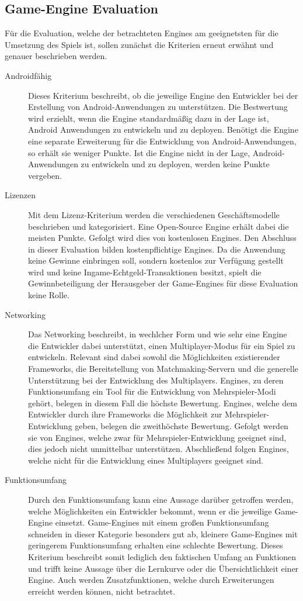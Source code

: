 \subsection{Game-Engine Evaluation}\label{ssec:engineeval}
	Für die Evaluation, welche der betrachteten Engines am geeignetsten für die Umsetzung des Spiels ist, sollen zunächst die Kriterien erneut erwähnt und genauer beschrieben werden.
	\begin{description}
			\item[Androidfähig]{Dieses Kriterium beschreibt, ob die jeweilige Engine den Entwickler bei der Erstellung von Android-Anwendungen zu unterstützen. Die Bestwertung wird erziehlt, wenn die Engine standardmäßig dazu in der Lage ist, Android Anwendungen zu entwickeln und zu deployen. Benötigt die Engine eine separate Erweiterung für die Entwicklung von Android-Anwendungen, so erhält sie weniger Punkte. Ist die Engine nicht in der Lage, Android-Anwendungen zu entwickeln und zu deployen, werden keine Punkte vergeben.}
			\item[Lizenzen]{Mit dem Lizenz-Kriterium werden die verschiedenen Geschäftsmodelle beschrieben und kategorisiert. Eine Open-Source Engine erhält dabei die meisten Punkte. Gefolgt wird dies von kostenlosen Engines. Den Abschluss in dieser Evaluation bilden kostenpflichtige Engines. Da die Anwendung keine Gewinne einbringen soll, sondern kostenlos zur Verfügung gestellt wird und keine Ingame-Echtgeld-Transaktionen besitzt, spielt die Gewinnbeteiligung der Herausgeber der Game-Engines für diese Evaluation keine Rolle.}
			\item[Networking]{Das Networking beschreibt, in wechlcher Form und wie sehr eine Engine die Entwickler dabei unterstützt, einen Multiplayer-Modus für ein Spiel zu entwickeln. Relevant sind dabei sowohl die Möglichkeiten existierender Frameworks, die Bereitstellung von Matchmaking-Servern und die generelle Unterstützung bei der Entwicklung des Multiplayers. Engines, zu deren Funktionsumfang ein Tool für die Entwicklung von Mehrspieler-Modi gehört, belegen in diesem Fall die höchste Bewertung. Engines, welche dem Entwickler durch ihre Frameworks die Möglichkeit zur Mehrspieler-Entwicklung geben, belegen die zweithöchste Bewertung. Gefolgt werden sie von Engines, welche zwar für Mehrspieler-Entwicklung geeignet sind, dies jedoch nicht unmittelbar unterstützen. Abschließend folgen Engines, welche nicht für die Entwicklung eines Multiplayers geeignet sind.}
			\item[Funktionsumfang]{Durch den Funktionsumfang kann eine Aussage darüber getroffen werden, welche Möglichkeiten ein Entwickler bekommt, wenn er die jeweilige Game-Engine einsetzt. Game-Engines mit einem großen Funktionsumfang schneiden in dieser Kategorie besonders gut ab, kleinere Game-Engines mit geringerem Funktionsumfang erhalten eine schlechte Bewertung. Dieses Kriterium beschreibt somit lediglich den faktischen Umfang an Funktionen und trifft keine Aussage über die Lernkurve oder die Übersichtlichkeit einer Engine. Auch werden Zusatzfunktionen, welche durch Erweiterungen erreicht werden können, nicht betrachtet.}

\end{description}
